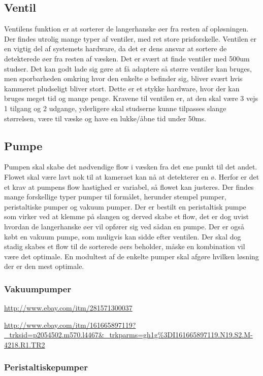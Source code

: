 \subsection{Ventil}
Ventilens funktion er at sorterer de langerhanske øer fra resten af opløsningen. Der findes utrolig mange typer af ventiler, med ret store prisforskelle. Ventilen er en vigtig del af systemets hardware, da det er dens ansvar at sortere de detekterede øer fra resten af væsken. Det er svært at finde ventiler med 500um studser. Det kan godt lade sig gøre at få adaptere så større ventiler kan bruges, men sporbarheden omkring hvor den enkelte ø befinder sig, bliver svært hvis kammeret pludseligt bliver stort. Dette er et stykke hardware, hvor der kan bruges meget tid og mange penge.
Kravene til ventilen er, at den skal være 3 vejs 1 tilgang og 2 udgange, yderligere skal studserne kunne tilpasses slange størrelsen, være til væske og have en lukke/åbne tid under 50ms.

\subsection{Pumpe}
Pumpen skal skabe det nødvendige flow i væsken fra det ene punkt til det andet. Flowet skal være lavt nok til at kameraet kan nå at detekterer en ø. Herfor er det et krav at pumpens flow hastighed er variabel, så flowet kan justeres. Der findes mange forskellige typer pumper til formålet, herunder stempel pumper, peristaltiske pumper og vakuum pumper. Der er bestilt en peristaltisk pumpe som virker ved at klemme på slangen og derved skabe et flow, det er dog uvist hvordan de langerhanske øer vil opfører sig ved sådan en pumpe. Der er også købt en vakuum pumpe, som muligvis kan sidde efter ventilen. Der skal dog stadig skabes et flow til de sorterede øers beholder, måske en kombination vil være det optimale. En modultest af de enkelte pumper skal afgøre hvilken løsning der er den mest optimale. 

\subsubsection{Vakuumpumper}
\url{ http://www.ebay.com/itm/281571300037}

\url{http://www.ebay.com/itm/161665897119?_trksid=p2054502.m570.l4467&_trkparms=gh1g%3DI161665897119.N19.S2.M-4218.R1.TR2}

\subsubsection{Peristaltiskepumper}

